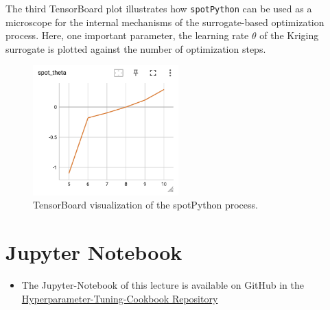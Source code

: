 \documentclass[
  letterpaper,
  DIV=11,
  numbers=noendperiod]{scrreprt}
\providecommand{\tightlist}{%
  \setlength{\itemsep}{0pt}\setlength{\parskip}{0pt}}\usepackage{longtable,booktabs,array}
\begin{document}
The third TensorBoard plot illustrates how \texttt{spotPython} can be
used as a microscope for the internal mechanisms of the surrogate-based
optimization process. Here, one important parameter, the learning rate
\(\theta\) of the Kriging surrogate is plotted against the number of
optimization steps.

\begin{figure}[H]

{\centering \includegraphics[width=0.5\textwidth,height=\textheight]{figures_static/01_tensorboard_03.png}

}

\caption{TensorBoard visualization of the spotPython process.}

\end{figure}%

\section{Jupyter Notebook}\label{jupyter-notebook-6}

\begin{tcolorbox}[enhanced jigsaw, rightrule=.15mm, coltitle=black, title=\textcolor{quarto-callout-note-color}{\faInfo}\hspace{0.5em}{Note}, opacitybacktitle=0.6, bottomrule=.15mm, opacityback=0, left=2mm, colback=white, leftrule=.75mm, colframe=quarto-callout-note-color-frame, colbacktitle=quarto-callout-note-color!10!white, toprule=.15mm, toptitle=1mm, bottomtitle=1mm, titlerule=0mm, breakable, arc=.35mm]

\begin{itemize}
\tightlist
\item
  The Jupyter-Notebook of this lecture is available on GitHub in the
  \href{https://github.com/sequential-parameter-optimization/Hyperparameter-Tuning-Cookbook/blob/main/007_num_spot_intro.ipynb}{Hyperparameter-Tuning-Cookbook
  Repository}
\end{itemize}

\end{tcolorbox}
\end{document}

